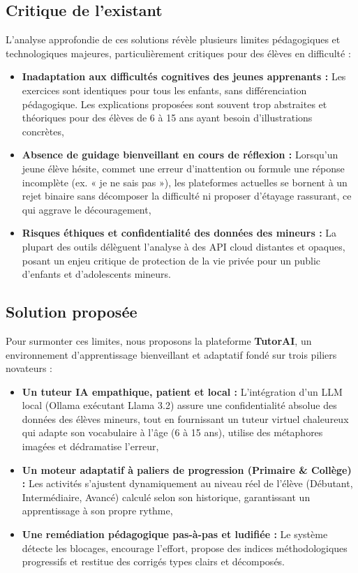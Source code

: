 \documentclass[12pt,a4paper]{report}
\begin{document}
\subsection{Critique de l'existant}
L'analyse approfondie de ces solutions révèle plusieurs limites pédagogiques et technologiques majeures, particulièrement critiques pour des élèves en difficulté :
\begin{itemize}
  \item[—] \textbf{Inadaptation aux difficultés cognitives des jeunes apprenants :} Les exercices sont identiques pour tous les enfants, sans différenciation pédagogique. Les explications proposées sont souvent trop abstraites et théoriques pour des élèves de 6 à 15 ans ayant besoin d'illustrations concrètes,
  \item[—] \textbf{Absence de guidage bienveillant en cours de réflexion :} Lorsqu'un jeune élève hésite, commet une erreur d'inattention ou formule une réponse incomplète (ex. « je ne sais pas »), les plateformes actuelles se bornent à un rejet binaire sans décomposer la difficulté ni proposer d'étayage rassurant, ce qui aggrave le découragement,
  \item[—] \textbf{Risques éthiques et confidentialité des données des mineurs :} La plupart des outils délèguent l'analyse à des API cloud distantes et opaques, posant un enjeu critique de protection de la vie privée pour un public d'enfants et d'adolescents mineurs.
\end{itemize}

\subsection{Solution proposée}
Pour surmonter ces limites, nous proposons la plateforme \textbf{TutorAI}, un environnement d'apprentissage bienveillant et adaptatif fondé sur trois piliers novateurs :
\begin{itemize}
  \item[—] \textbf{Un tuteur IA empathique, patient et local :} L'intégration d'un LLM local (Ollama exécutant Llama 3.2) assure une confidentialité absolue des données des élèves mineurs, tout en fournissant un tuteur virtuel chaleureux qui adapte son vocabulaire à l'âge (6 à 15 ans), utilise des métaphores imagées et dédramatise l'erreur,
  \item[—] \textbf{Un moteur adaptatif à paliers de progression (Primaire \& Collège) :} Les activités s'ajustent dynamiquement au niveau réel de l'élève (Débutant, Intermédiaire, Avancé) calculé selon son historique, garantissant un apprentissage à son propre rythme,
  \item[—] \textbf{Une remédiation pédagogique pas-à-pas et ludifiée :} Le système détecte les blocages, encourage l'effort, propose des indices méthodologiques progressifs et restitue des corrigés types clairs et décomposés.
\end{itemize}
\end{document}
